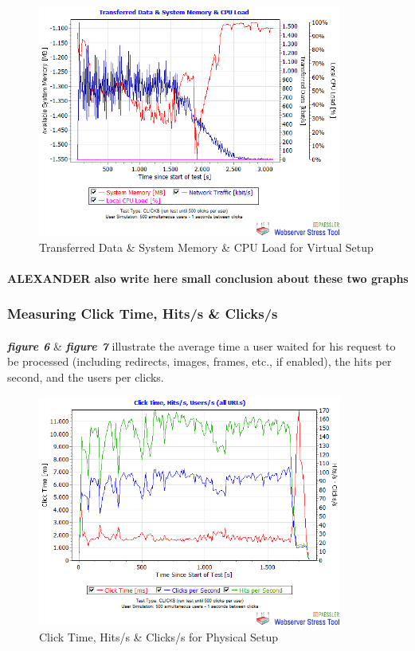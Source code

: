  
\begin{figure}[H]
    \centering
    \includegraphics[width=10cm]{Pictures/vm1.png}
    \caption{Transferred Data \& System Memory \& CPU Load for Virtual Setup}
    \label{fig:QQ3}
\end{figure} 


\paragraph{}
\textbf{ALEXANDER also write here small conclusion about these two graphs}

\subsubsection{Measuring Click Time, Hits/s \& Clicks/s}
\paragraph{}

\textbf{\textit{figure 6}} \& \textbf{\textit{figure 7}} illustrate the average time a user waited for his request to be processed (including redirects, images, frames, etc., if enabled), the hits per second, and the users per clicks. 

 \begin{figure}[H]
    \centering
    \includegraphics[width=10cm]{Pictures/ph2.png}
    \caption{Click Time, Hits/s \& Clicks/s for Physical Setup}
    \label{fig:QQ3}
\end{figure}
   
